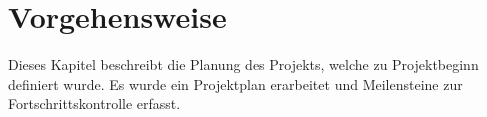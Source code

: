 \section{Vorgehensweise}

Dieses Kapitel beschreibt die Planung des Projekts, welche zu Projektbeginn definiert wurde.
Es wurde ein Projektplan erarbeitet und Meilensteine zur Fortschrittskontrolle erfasst.



